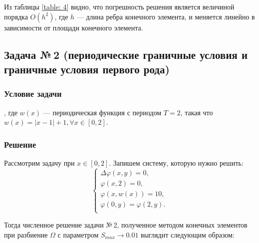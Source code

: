 \documentclass[12pt, a4paper]{article}
\renewcommand{\phi}{\varphi}
\begin{document}
		Из таблицы \ref{table: 4} видно, что погрешность решения является величиной порядка $O(h^2)$, где $h$ --- длина ребра конечного элемента, и меняется линейно в зависимости от площади конечного элемента.
			
	\newpage
	\subsection{Задача №\,2 (периодические граничные условия и граничные условия первого рода)}
		\subsubsection{Условие задачи}
			, где $w(x)$ --- периодическая функция с периодом $T = 2$, такая что $w(x) = |x - 1| + 1, \forall x \in \left[ 0, 2 \right]$. 
		\subsubsection{Решение}
			Рассмотрим задачу при $x \in \left[ 0, 2 \right]$. Запишем систему, которую нужно решить:
			\begin{equation*}
				\begin{cases}
					\Delta \phi (x, y)  = 0, \\
					\phi (x, 2) = 0, \\
					\phi (x, w(x)) = 10, \\
					\phi (0, y) = \phi (2, y).\\
				\end{cases}
			\end{equation*}
			
			Тогда численное решение задачи №\,2, полученное методом конечных элементов при разбиение $\Omega$ с параметром $S_{max} \rightarrow 0.01$ выглядит следующим образом: 
		
			
\end{document}
